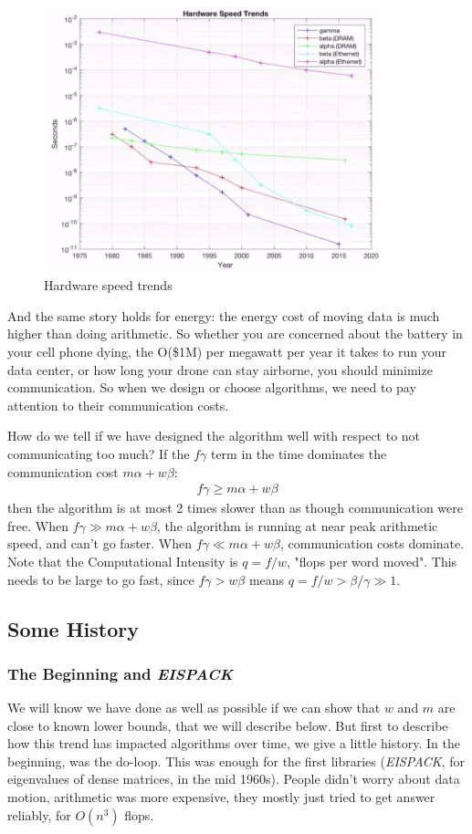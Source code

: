 \documentclass[11pt]{article}
\numberwithin{equation}{section}
\begin{document}
\begin{figure}[h]
    \centering
    \includegraphics[width = 10cm]{images/lec4-3.png}
    \caption{Hardware speed trends}
\end{figure}

And the same story holds for energy: the energy cost of moving data is much higher than doing arithmetic. So whether you are concerned about the battery in your cell phone dying, 
the O(\$1M) per megawatt per year it takes to run your data center, or how long your drone can stay airborne, you should minimize communication.
So when we design or choose algorithms, we need to pay attention to their communication costs. 

How do we tell if we have designed the algorithm well with respect to not communicating too much? If the $f\gamma$ term in the time dominates the communication cost $m\alpha + w\beta$:
\begin{align*}
    f\gamma \geq m\alpha + w\beta
\end{align*}
then the algorithm is at most 2 times slower than as though communication were free. When $f\gamma \gg m\alpha + w\beta$, 
the algorithm is running at near peak arithmetic speed, and can't go faster. When $f\gamma \ll m\alpha + w\beta$, communication costs dominate.
Note that the Computational Intensity is $q = f/w$, "flops per word moved". This needs to be large to go fast, since $f\gamma > w\beta$ means $q = f/w > \beta/\gamma \gg 1$.

\subsection{Some History}
\subsubsection{The Beginning and \textit{EISPACK}}
We will know we have done as well as possible if we can show that $w$ and $m$ are close to known lower bounds, that we will describe below.
But first to describe how this trend has impacted algorithms over time, we give a little history. In the beginning, was the do-loop. 
This was enough for the first libraries (\textit{EISPACK}, for eigenvalues of dense matrices, in the mid 1960s). People didn't worry about data motion, 
arithmetic was more expensive, they mostly just tried to get answer reliably, for $O(n^3)$ flops.
\end{document}
